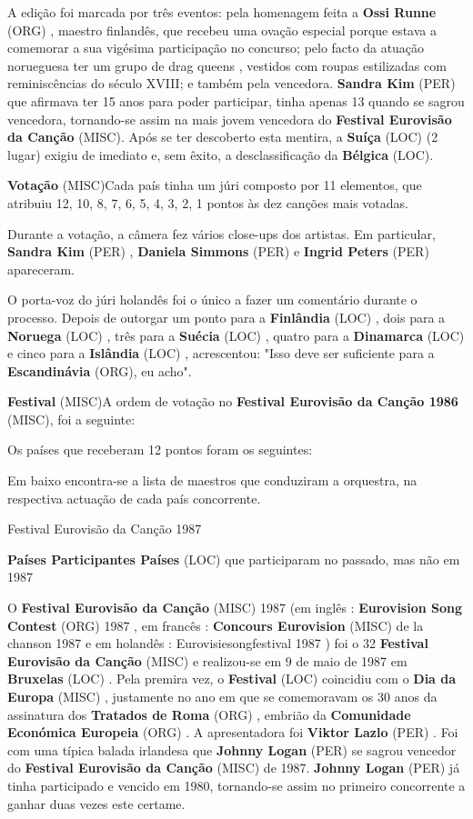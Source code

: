 \documentclass[12pt,a4paper]{article}
\begin{document}
A edição foi marcada por três eventos: pela homenagem feita a \textbf{Ossi Runne} (ORG) , maestro finlandês, que recebeu uma ovação especial porque estava a comemorar a sua vigésima participação no concurso; pelo facto da atuação norueguesa ter um grupo de drag queens , vestidos com roupas estilizadas com reminiscências do século XVIII; e também pela vencedora. \textbf{Sandra Kim} (PER) que afirmava ter 15 anos para poder participar, tinha apenas 13 quando se sagrou vencedora, tornando-se assim na mais jovem vencedora do \textbf{Festival Eurovisão da Canção} (MISC). Após se ter descoberto esta mentira, a \textbf{Suíça} (LOC) (2 lugar) exigiu de imediato e, sem êxito, a desclassificação da \textbf{Bélgica} (LOC).



\textbf{Votação} (MISC)Cada país tinha um júri composto por 11 elementos, que atribuiu 12, 10, 8, 7, 6, 5, 4, 3, 2, 1 pontos às dez canções mais votadas.

Durante a votação, a câmera fez vários close-ups dos artistas. Em particular, \textbf{Sandra Kim} (PER) , \textbf{Daniela Simmons} (PER) e \textbf{Ingrid Peters} (PER) apareceram.

O porta-voz do júri holandês foi o único a fazer um comentário durante o processo. Depois de outorgar um ponto para a \textbf{Finlândia} (LOC) , dois para a \textbf{Noruega} (LOC) , três para a \textbf{Suécia} (LOC) , quatro para a \textbf{Dinamarca} (LOC) e cinco para a \textbf{Islândia} (LOC) , acrescentou: "Isso deve ser suficiente para a \textbf{Escandinávia} (ORG), eu acho".



\textbf{Festival} (MISC)A ordem de votação no \textbf{Festival Eurovisão da Canção 1986} (MISC), foi a seguinte:

Os países que receberam 12 pontos foram os seguintes:

Em baixo encontra-se a lista de maestros que conduziram a orquestra, na respectiva actuação de cada país concorrente.



Festival Eurovisão da Canção 1987



\textbf{Países Participantes Países} (LOC) que participaram no passado, mas não em 1987

O \textbf{Festival Eurovisão da Canção} (MISC) 1987 (em inglês : \textbf{Eurovision Song Contest} (ORG) 1987 , em francês : \textbf{Concours Eurovision} (MISC) de la chanson 1987 e em holandês : Eurovisiesongfestival 1987 ) foi o 32 \textbf{Festival Eurovisão da Canção} (MISC) e realizou-se em 9 de maio de 1987 em \textbf{Bruxelas} (LOC) . Pela premira vez, o \textbf{Festival} (LOC) coincidiu com o \textbf{Dia da Europa} (MISC) , justamente no ano em que se comemoravam os 30 anos da assinatura dos \textbf{Tratados de Roma} (ORG) , embrião da \textbf{Comunidade Económica Europeia} (ORG) . A apresentadora foi \textbf{Viktor Lazlo} (PER) . Foi com uma típica balada irlandesa que \textbf{Johnny Logan} (PER) se sagrou vencedor do \textbf{Festival Eurovisão da Canção} (MISC) de 1987. \textbf{Johnny Logan} (PER) já tinha participado e vencido em 1980, tornando-se assim no primeiro concorrente a ganhar duas vezes este certame.
\end{document}
